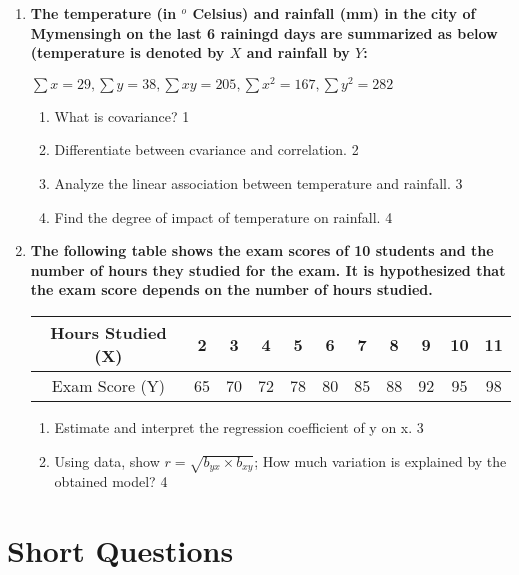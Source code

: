 \documentclass[a4paper,oneside]{book}
\begin{document}
 \begin{enumerate}
 
  \item
	  \textbf{The temperature (in $^o$ Celsius) and rainfall (mm) in the city of Mymensingh on the last 6 rainingd days are summarized as below (temperature is denoted by $X$ and rainfall by $Y$: } 
	  
	  \begin{center}
	  $\sum x = 29, \sum y = 38, \sum xy = 205, \sum x^2 = 167, \sum y^2 = 282$
  \end{center}
  \begin{enumerate}
    \item
	What is covariance? \hfill 1
    \item
	Differentiate between cvariance and correlation. \hfill 2
    \item  
	Analyze the linear association between temperature and rainfall. \hfill 3
    \item
	Find the degree of impact of temperature on rainfall. \hfill 4
  \end{enumerate}
 
  \item
	  \textbf{The following table shows the exam scores of 10 students and the number of hours they studied for the exam. It is hypothesized that the exam score depends on the number of hours studied.} 
	  
\begin{table}[h!]
\centering
\begin{tabular}{c|c|c|c|c|c|c|c|c|c|c}
Hours Studied (X) & 2 & 3 & 4 & 5 & 6 & 7 & 8 & 9 & 10 & 11 \\ \hline
Exam Score (Y) & 65 & 70 & 72 & 78 & 80 & 85 & 88 & 92 & 95 & 98 \\
\end{tabular}
\end{table}
  
  \begin{enumerate}
    \item  
	Estimate and interpret the regression coefficient of y on x. \hfill 3
    \item
	Using data, show $r = \sqrt{b_{yx} \times b_{xy}}$; How much variation is explained by the obtained model? \hfill 4
  \end{enumerate}
\end{enumerate}

\section{Short Questions}
\end{document}
